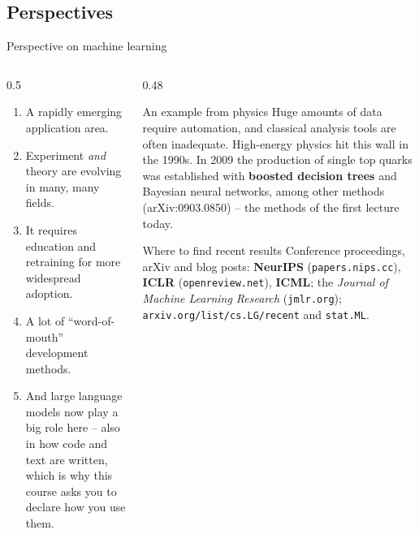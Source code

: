 \documentclass[10pt,aspectratio=169]{beamer}
\begin{document}
\subsection{Perspectives}

\begin{frame}{Perspective on machine learning}
\begin{columns}[T]
\begin{column}{0.5\textwidth}
\small
\begin{enumerate}
  \item A rapidly emerging application area.
  \item Experiment \emph{and} theory are evolving in many, many fields.
  \item It requires education and retraining for more widespread adoption.
  \item A lot of ``word-of-mouth'' development methods.
  \item And large language models now play a big role here -- also in how
    code and text are written, which is why this course asks you to declare
    how you use them.
\end{enumerate}
\end{column}
\begin{column}{0.48\textwidth}
\small
\begin{block}{An example from physics}
\footnotesize
Huge amounts of data require automation, and classical analysis tools are
often inadequate.  High-energy physics hit this wall in the 1990s.  In 2009
the production of single top quarks was established with \textbf{boosted
decision trees} and Bayesian neural networks, among other methods
(arXiv:0903.0850) -- the methods of the first lecture today.
\end{block}
\begin{block}{Where to find recent results}
\footnotesize
Conference proceedings, arXiv and blog posts: \textbf{NeurIPS}
(\texttt{papers.nips.cc}), \textbf{ICLR} (\texttt{openreview.net}),
\textbf{ICML}; the \emph{Journal of Machine Learning Research}
(\texttt{jmlr.org}); \texttt{arxiv.org/list/cs.LG/recent} and
\texttt{stat.ML}.
\end{block}
\end{column}
\end{columns}
\end{frame}
\end{document}
